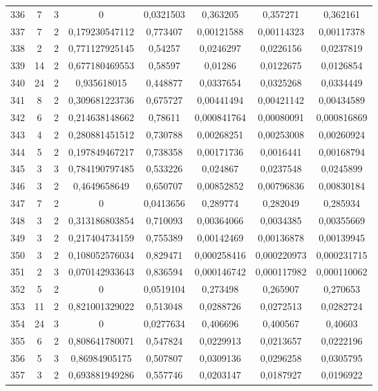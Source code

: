 \begin{longtable}{|c|c|c|c|c|c|c|c|}
336 & 7 & 3 & 0 & 0,0321503 & 0,363205 & 0,357271 & 0,362161  \\
337 & 7 & 2 & 0,179230547112 & 0,773407 & 0,00121588 & 0,00114323 & 0,00117378  \\
338 & 2 & 2 & 0,771127925145 & 0,54257 & 0,0246297 & 0,0226156 & 0,0237819  \\
339 & 14 & 2 & 0,677180469553 & 0,58597 & 0,01286 & 0,0122675 & 0,0126854  \\
340 & 24 & 2 & 0,935618015 & 0,448877 & 0,0337654 & 0,0325268 & 0,0334449  \\
341 & 8 & 2 & 0,309681223736 & 0,675727 & 0,00441494 & 0,00421142 & 0,00434589  \\
342 & 6 & 2 & 0,214638148662 & 0,78611 & 0,000841764 & 0,00080091 & 0,000816869  \\
343 & 4 & 2 & 0,280881451512 & 0,730788 & 0,00268251 & 0,00253008 & 0,00260924  \\
344 & 5 & 2 & 0,197849467217 & 0,738358 & 0,00171736 & 0,0016441 & 0,00168794  \\
345 & 3 & 3 & 0,784190797485 & 0,533226 & 0,024867 & 0,0237548 & 0,0245899  \\
346 & 3 & 2 & 0,4649658649 & 0,650707 & 0,00852852 & 0,00796836 & 0,00830184  \\
347 & 7 & 2 & 0 & 0,0413656 & 0,289774 & 0,282049 & 0,285934  \\
348 & 3 & 2 & 0,313186803854 & 0,710093 & 0,00364066 & 0,0034385 & 0,00355669  \\
349 & 3 & 2 & 0,217404734159 & 0,755389 & 0,00142469 & 0,00136878 & 0,00139945  \\
350 & 3 & 2 & 0,108052576034 & 0,829471 & 0,000258416 & 0,000220973 & 0,000231715  \\
351 & 2 & 3 & 0,070142933643 & 0,836594 & 0,000146742 & 0,000117982 & 0,000110062  \\
352 & 5 & 2 & 0 & 0,0519104 & 0,273498 & 0,265907 & 0,270653  \\
353 & 11 & 2 & 0,821001329022 & 0,513048 & 0,0288726 & 0,0272513 & 0,0282724  \\
354 & 24 & 3 & 0 & 0,0277634 & 0,406696 & 0,400567 & 0,40603  \\
355 & 6 & 2 & 0,808641780071 & 0,547824 & 0,0229913 & 0,0213657 & 0,0222196  \\
356 & 5 & 3 & 0,86984905175 & 0,507807 & 0,0309136 & 0,0296258 & 0,0305795  \\
357 & 3 & 2 & 0,693881949286 & 0,557746 & 0,0203147 & 0,0187927 & 0,0196922  \\

\end{longtable}

